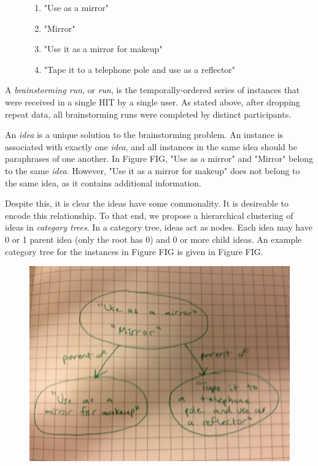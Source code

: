 \begin{figure}[!h]
    \begin{enumerate}
        \item "Use as a mirror"
        \item "Mirror"
        \item "Use it as a mirror for makeup"
        \item "Tape it to a telephone pole and use as a reflector"
    \end{enumerate}
    \label{sample_instances}
\end{figure}

A \emph{brainstorming run}, or \emph{run}, is the temporally-ordered series of instances that were received in a single HIT by a single user. As stated above, after dropping repeat data, all brainstorming runs were completed by distinct participants.

An \emph{idea} is a unique solution to the brainstorming problem. An instance is associated with exactly one \emph{idea}, and all instances in the same idea should be paraphrases of one another. In Figure FIG, "Use as a mirror" and "Mirror" belong to the same \emph{idea}. However, "Use it as a mirror for makeup" does not belong to the same idea, as it contains additional information.

Despite this, it is clear the ideas have some commonality. It is desireable to encode this relationship. To that end, we propose a hierarchical clustering of ideas in \emph{category trees}. In a category tree, ideas act as nodes. Each idea may have 0 or 1 parent idea (only the root has 0) and 0 or more child ideas. An example category tree for the instances in Figure FIG is given in Figure FIG.

\begin{figure}[!h]
    \centering
    \includegraphics[width=0.9\columnwidth]{sample_category_tree}
\end{figure}

